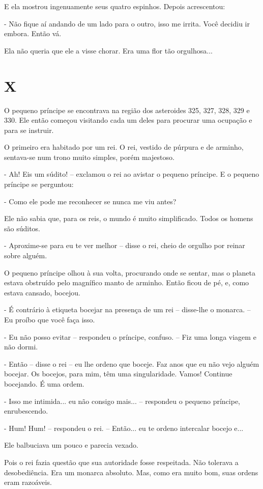 E ela mostrou ingenuamente seus quatro espinhos. Depois acrescentou:

- Não fique aí andando de um lado para o outro, isso me irrita. Você
decidiu ir embora. Então vá.

Ela não queria que ele a visse chorar. Era uma flor tão orgulhosa...

\chapter{X}

O pequeno príncipe se encontrava na região dos asteroides 325, 327, 328,
329 e 330. Ele então começou visitando cada um deles para procurar uma
ocupação e para se instruir.

O primeiro era habitado por um rei. O rei, vestido de púrpura e de
arminho, sentava-se num trono muito simples, porém majestoso.

- Ah! Eis um súdito! -- exclamou o rei ao avistar o pequeno príncipe. E
o pequeno príncipe se perguntou:

- Como ele pode me reconhecer se nunca me viu antes?

Ele não sabia que, para os reis, o mundo é muito simplificado. Todos os
homens são súditos.

- Aproxime-se para eu te ver melhor -- disse o rei, cheio de orgulho por
reinar sobre alguém.

O pequeno príncipe olhou à sua volta, procurando onde se sentar, mas o
planeta estava obstruído pelo magnífico manto de arminho. Então ficou de
pé, e, como estava cansado, bocejou.

- É contrário à etiqueta bocejar na presença de um rei -- disse-lhe o
monarca. -- Eu proíbo que você faça isso.

- Eu não posso evitar -- respondeu o príncipe, confuso. -- Fiz uma longa
viagem e não dormi.

- Então -- disse o rei -- eu lhe ordeno que boceje. Faz anos que eu não
vejo alguém bocejar. Os bocejos, para mim, têm uma singularidade. Vamos!
Continue bocejando. É uma ordem.

- Isso me intimida... eu não consigo mais... -- respondeu o pequeno
príncipe, enrubescendo.

- Hum! Hum! -- respondeu o rei. -- Então... eu te ordeno intercalar
bocejo e...

Ele balbuciava um pouco e parecia vexado.

Pois o rei fazia questão que sua autoridade fosse respeitada. Não
tolerava a desobediência. Era um monarca absoluto. Mas, como era muito
bom, suas ordens eram razoáveis.

